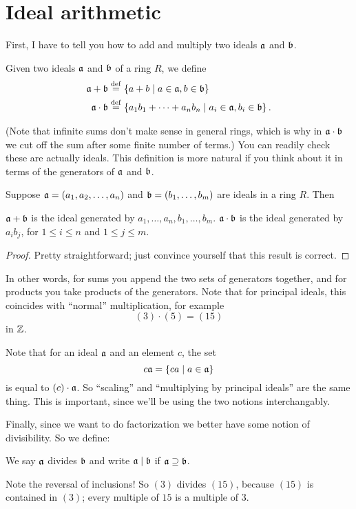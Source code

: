 \section{Ideal arithmetic}
First, I have to tell you how to add and multiply two ideals $\aa$ and $\bb$.
\begin{definition}
	Given two ideals $\aa$ and $\bb$ of a ring $R$, we define
	\begin{align*}
		\aa + \bb &\defeq \left\{ a+b \mid a \in \aa, b \in \bb \right\} \\
		\aa \cdot \bb &\defeq \left\{ a_1b_1 + \dots + a_nb_n \mid a_i \in \aa, b_i \in \bb \right\}.
	\end{align*}
\end{definition}
(Note that infinite sums don't make sense in general rings, which is why in $\aa \cdot \bb$
we cut off the sum after some finite number of terms.)
You can readily check these are actually ideals.
This definition is more natural if you think about it in terms of 
the generators of $\aa$ and $\bb$.
\begin{proposition}
	Suppose $\aa = \left( a_1, a_2, \dots, a_n \right)$
	and $\bb = \left( b_1, \dots, b_m \right)$ are ideals in a ring $R$.
	Then
	\begin{enumerate}[(a)]
		\ii $\aa + \bb$ is the ideal generated by $a_1, \dots, a_n, b_1, \dots, b_m$.
		\ii $\aa \cdot \bb$ is the ideal generated by $a_i b_j$, for $1 \le i \le n$ and $1 \le j \le m$.
	\end{enumerate}
\end{proposition}
\begin{proof}
	Pretty straightforward; just convince yourself that this result is correct.
\end{proof}
In other words, for sums you append the two sets of generators together,
and for products you take products of the generators.
Note that for principal ideals, this coincides with ``normal'' multiplication,
for example
\[ (3) \cdot (5) = (15) \]
in $\ZZ$.
\begin{remark}
Note that for an ideal $\aa$ and an element $c$,
the set \[ c \aa = \left\{ ca \mid a \in \aa \right\} \]
is equal to $(c) \cdot \aa$.
So ``scaling'' and ``multiplying by principal ideals'' are the same thing.
This is important, since we'll be using the two notions interchangably.
\end{remark}

Finally, since we want to do factorization we better have some notion of divisibility.
So we define:
\begin{definition}
	We say $\aa$ divides $\bb$ and write $\aa \mid \bb$ if $\aa \supseteq \bb$.
\end{definition}
Note the reversal of inclusions!
So $(3)$ divides $(15)$, because $(15)$ is contained in $(3)$;
every multiple of $15$ is a multiple of $3$.

